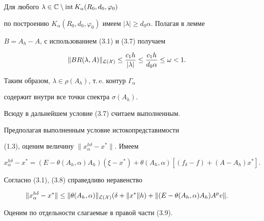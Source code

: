  


\begin{pf} 


Для любого $\lambda\in\Bbb C\setminus\operatorname{int} K_\alpha(R_0,d_0,\varphi_0)$ 


по построению $K_\alpha(R_0,d_0,\varphi_0)$ имеем $|\lambda|\ge 


d_0\alpha$. Полагая в лемме 


$B=A_h-A$, с использованием (3.1) и (3.7) получаем 


$$ 


\|B R(\lambda,A)\|_{\cal L(X)}\le\frac{c_1h}{|\lambda|}\le 


\frac{c_1h}{d_0\alpha}\le\omega<1. 


$$ 


Таким образом, $\lambda\in\rho(A_h)$, т.\,e. контур $\Gamma_\alpha$ 


содержит внутри все точки спектра $\sigma(A_h)$. 


\end{pf} 


 


Всюду в дальнейшем условие (3.7) считаем выполненным. 


 


Предполагая выполненным условие истокопредставимости 


(1.3), оценим величину $\|x^{h\delta}_\alpha-x^*\|$. Имеем 


\begin{equation} 


x^{h\delta}_\alpha-x^*=(E-\theta(A_h,\alpha)A_h) 


(\xi-x^*)+\theta(A_h,\alpha)[(f_\delta-f)+ 


(A-A_h)x^*]. 


\end{equation} 


Согласно (3.1), (3.8) справедливо неравенство 


\begin{equation} 


\|x^{h\delta}_\alpha-x^*\|\le\|\theta(A_h,\alpha)\|_{\cal L(X)} 


(\delta+\|x^*\|h)+\|(E-\theta(A_h,\alpha)A_h) 


A^p v\|. 


\end{equation} 


Оценим по отдельности слагаемые в правой части (3.9). 


